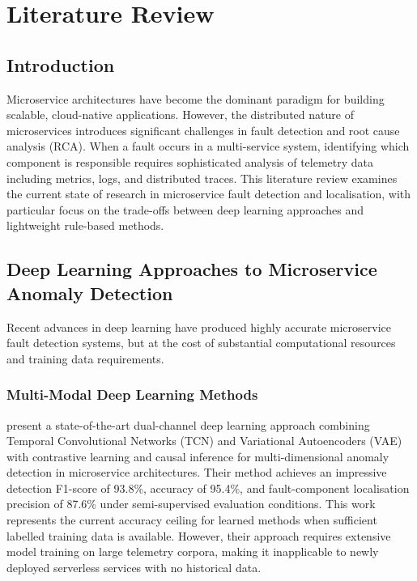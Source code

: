 \chapter{Literature Review}

\section{Introduction}

Microservice architectures have become the dominant paradigm for building scalable, cloud-native applications. However, the distributed nature of microservices introduces significant challenges in fault detection and root cause analysis (RCA). When a fault occurs in a multi-service system, identifying which component is responsible requires sophisticated analysis of telemetry data including metrics, logs, and distributed traces. This literature review examines the current state of research in microservice fault detection and localisation, with particular focus on the trade-offs between deep learning approaches and lightweight rule-based methods.

\section{Deep Learning Approaches to Microservice Anomaly Detection}

Recent advances in deep learning have produced highly accurate microservice fault detection systems, but at the cost of substantial computational resources and training data requirements.

\subsection{Multi-Modal Deep Learning Methods}

\citet{xing2025dualchannel} present a state-of-the-art dual-channel deep learning approach combining Temporal Convolutional Networks (TCN) and Variational Autoencoders (VAE) with contrastive learning and causal inference for multi-dimensional anomaly detection in microservice architectures. Their method achieves an impressive detection F1-score of 93.8\%, accuracy of 95.4\%, and fault-component localisation precision of 87.6\% under semi-supervised evaluation conditions. This work represents the current accuracy ceiling for learned methods when sufficient labelled training data is available. However, their approach requires extensive model training on large telemetry corpora, making it inapplicable to newly deployed serverless services with no historical data.

